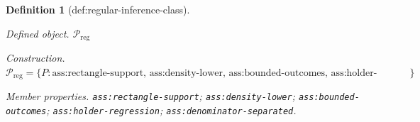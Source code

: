 \documentclass{article}
\newtheorem{definition}{Definition}
\begin{document}
\begin{definition}[def:regular-inference-class]\label{def:regular-inference-class}
\par\smallskip\noindent\emph{Defined object.} \(\mathcal P_{\mathrm{reg}}\)
\par\smallskip\noindent\emph{Construction.} \(\mathcal P_{\mathrm{reg}}=\{P:\text{ass:rectangle-support, ass:density-lower, ass:bounded-outcomes, ass:holder-regression, and ass:denominator-separated hold}\}\)
\par\smallskip\noindent\emph{Member properties.} \texttt{ass:\allowbreak{}rectangle-\allowbreak{}support}; \texttt{ass:\allowbreak{}density-\allowbreak{}lower}; \texttt{ass:\allowbreak{}bounded-\allowbreak{}outcomes}; \texttt{ass:\allowbreak{}holder-\allowbreak{}regression}; \texttt{ass:\allowbreak{}denominator-\allowbreak{}separated}.
\end{definition}
\end{document}
